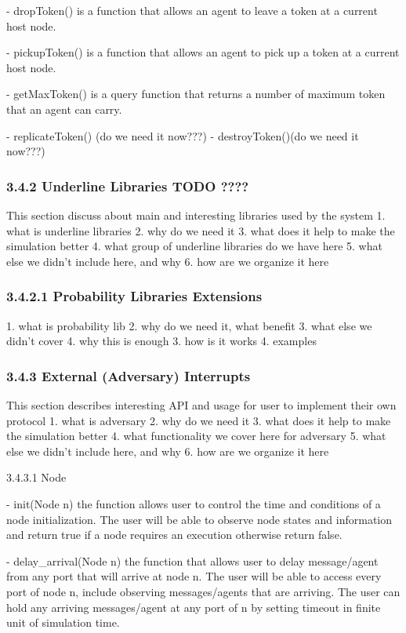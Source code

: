 \begin{description}
\begin{description}
\begin{description}
\begin{description}
- dropToken() is a function that allows an agent to leave a token at a current host node.

- pickupToken() is a function that allows an agent to pick up a token at a current host node.

- getMaxToken() is a query function that returns a number of maximum token that an agent can carry.

- replicateToken() (do we need it now???)
- destroyToken()(do we need it now???)

\subsubsection{3.4.2 Underline Libraries TODO ????}
This section discuss about main and interesting libraries used by the system
1. what is underline libraries
2. why do we need it
3. what does it help to make the simulation better
4. what group of underline libraries do we have here
5. what else we didn't include here, and why
6. how are we organize it here



\subsubsection{3.4.2.1 Probability Libraries Extensions}
1. what is probability lib
2. why do we need it, what benefit
3. what else we didn't cover
4. why this is enough
3. how is it works
4. examples



\subsubsection{3.4.3 External (Adversary) Interrupts}
This section describes interesting API and usage for user to implement their own protocol
1. what is adversary
2. why do we need it
3. what does it help to make the simulation better
4. what functionality we cover here for adversary
5. what else we didn't include here, and why
6. how are we organize it here


3.4.3.1 Node

- init(Node n) the function allows user to control the time and conditions of a node initialization. The user will be able to observe node states and information and return true if a node requires an execution otherwise return false.

- delay_arrival(Node n) the function that allows user to delay message/agent from any port that will arrive at node n. The user will be able to access every port of node n, include observing messages/agents that are arriving. The user can hold any arriving messages/agent at any port of n by setting timeout in finite unit of simulation time.


\end{description}
\end{description}
\end{description}
\end{description}
